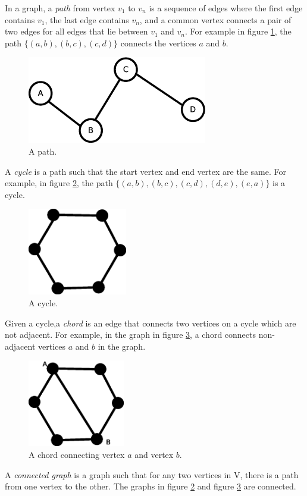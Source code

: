 In a graph, a \emph{path} from vertex $v_1$ to $v_n$ is a sequence of edges where the first edge contains $v_1$, the last edge contains $v_n$, and a common vertex connects a pair of two edges for all edges that lie between $v_1$ and $v_n$. For example in figure \ref{fig1}, the path $\{(a,b), (b,c),(c,d)\}$ connects the vertices $a$ and $b$. 
\begin{figure}[htbp]
	\centering
\includegraphics[height=1.5in]{path.eps}
\caption{A path.}
\label{fig1}
\end{figure}
A \emph{cycle} is a path such that the start vertex and end vertex are the same. For example, in figure \ref{cycle}, the path $\{(a,b),(b,c),(c,d),(d,e),(e,a)\}$ is a cycle. 
\begin{figure}[htbp]
	\centering
\includegraphics[height=1.5in]{cycle.eps}
\caption{A cycle.}
\label{cycle}
\end{figure}
Given a cycle,a \emph{chord} is an edge that connects two vertices on a cycle which are not adjacent. For example, in the graph in figure \ref{chord}, a chord connects non-adjacent vertices $a$ and $b$ in the graph.
\begin{figure}
	\centering
\includegraphics[height=1.5in]{chord.eps}
\caption{A chord connecting vertex $a$ and vertex $b$.}
\label{chord}
\end{figure}
A \emph{connected graph} is a graph such that for any two vertices in V, there is a path from one vertex to the other. The graphs in figure \ref{cycle} and figure \ref{chord} are connected.

